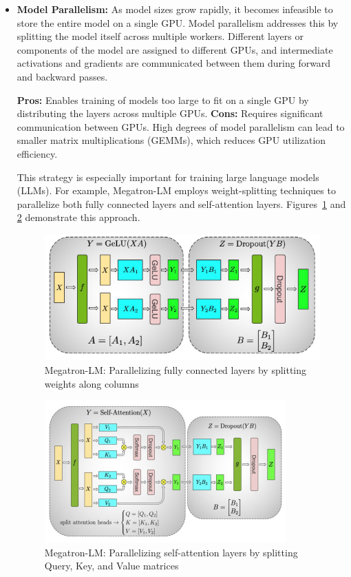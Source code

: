 \documentclass[12pt]{book}
\begin{document}
\begin{itemize}
    \item \textbf{Model Parallelism:}  
    As model sizes grow rapidly, it becomes infeasible to store the entire model on a single GPU. Model parallelism addresses this by splitting the model itself across multiple workers. Different layers or components of the model are assigned to different GPUs, and intermediate activations and gradients are communicated between them during forward and backward passes.  

    \textbf{Pros:} Enables training of models too large to fit on a single GPU by distributing the layers across multiple GPUs.  
    \textbf{Cons:} Requires significant communication between GPUs. High degrees of model parallelism can lead to smaller matrix multiplications (GEMMs), which reduces GPU utilization efficiency.  

    This strategy is especially important for training large language models (LLMs). For example, Megatron-LM employs weight-splitting techniques to parallelize both fully connected layers and self-attention layers. Figures~\ref{fig:llLLMs} and \ref{fig:megaLLm2} demonstrate this approach.  

    \begin{figure}[ht]
        \centering
        \includegraphics[width=0.75\linewidth]{images/llLLMS.png}
        \caption{Megatron-LM: Parallelizing fully connected layers by splitting weights along columns}
        \label{fig:llLLMs}
    \end{figure}

    \begin{figure}[ht]
        \centering
        \includegraphics[width=0.75\linewidth]{images/LLLMsMega.png}
        \caption{Megatron-LM: Parallelizing self-attention layers by splitting Query, Key, and Value matrices}
        \label{fig:megaLLm2}
    \end{figure}


\end{itemize}
\end{document}
